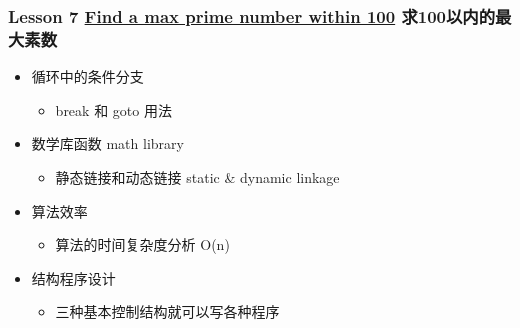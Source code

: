\begin{frame}\frametitle{Lesson 7 \href{Lesson-7.md}{Find a max prime
number within 100} 求100以内的最大素数}

\begin{itemize}
\item
  循环中的条件分支
  \begin{itemize}
  \item
    break 和 goto 用法\\
  \end{itemize}
\item
  数学库函数 math library
  \begin{itemize}
  \item
    静态链接和动态链接 static \& dynamic linkage
  \end{itemize}
\item
  算法效率
  \begin{itemize}
  \item
    算法的时间复杂度分析 O(n)
  \end{itemize}
\item
  结构程序设计
  \begin{itemize}
  \item
    三种基本控制结构就可以写各种程序
  \end{itemize}
\end{itemize}
\end{frame}
